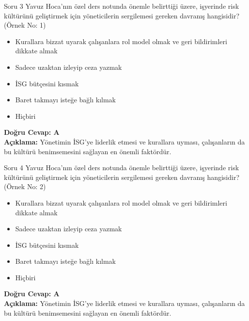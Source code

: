 \documentclass[12pt,a4paper]{article}
\begin{document}
\begin{testcard}{Soru 3}
    Yavuz Hoca'nın özel ders notunda önemle belirttiği üzere, işyerinde risk kültürünü geliştirmek için yöneticilerin sergilemesi gereken davranış hangisidir? (Örnek No: 1)
    \begin{itemize}
        \item[A)] Kurallara bizzat uyarak çalışanlara rol model olmak ve geri bildirimleri dikkate almak
        \item[B)] Sadece uzaktan izleyip ceza yazmak
        \item[C)] İSG bütçesini kısmak
        \item[D)] Baret takmayı isteğe bağlı kılmak
        \item[E)] Hiçbiri
    \end{itemize}
    \tcblower
    \textbf{Doğru Cevap: A} \\
    \textbf{Açıklama:} Yönetimin İSG'ye liderlik etmesi ve kurallara uyması, çalışanların da bu kültürü benimsemesini sağlayan en önemli faktördür.
\end{testcard}

\begin{testcard}{Soru 4}
    Yavuz Hoca'nın özel ders notunda önemle belirttiği üzere, işyerinde risk kültürünü geliştirmek için yöneticilerin sergilemesi gereken davranış hangisidir? (Örnek No: 2)
    \begin{itemize}
        \item[A)] Kurallara bizzat uyarak çalışanlara rol model olmak ve geri bildirimleri dikkate almak
        \item[B)] Sadece uzaktan izleyip ceza yazmak
        \item[C)] İSG bütçesini kısmak
        \item[D)] Baret takmayı isteğe bağlı kılmak
        \item[E)] Hiçbiri
    \end{itemize}
    \tcblower
    \textbf{Doğru Cevap: A} \\
    \textbf{Açıklama:} Yönetimin İSG'ye liderlik etmesi ve kurallara uyması, çalışanların da bu kültürü benimsemesini sağlayan en önemli faktördür.
\end{testcard}
\end{document}
